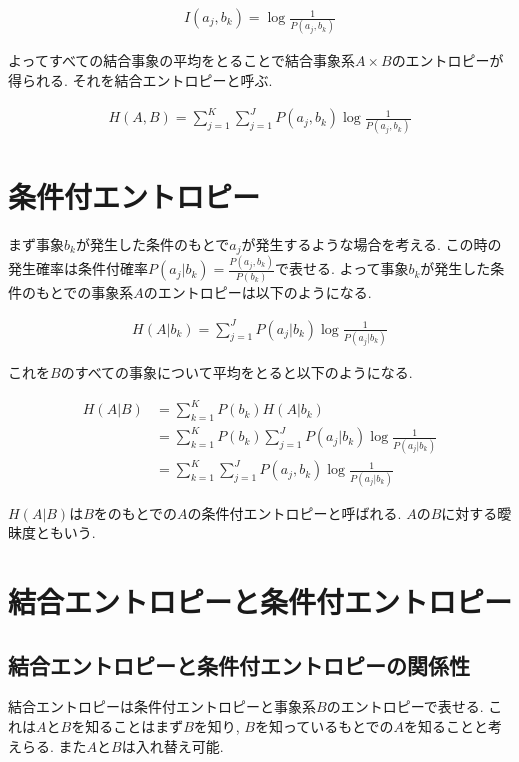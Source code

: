 \documentclass[dvipdfmx, 10pt]{jsarticle}
\begin{document}
\begin{align*}
    I(a_j, b_k) = \log \frac{1}{P(a_j, b_k)}
\end{align*}

よってすべての結合事象の平均をとることで結合事象系\(A \times B\)のエントロピーが得られる. それを結合エントロピーと呼ぶ. 

\begin{align*}
    H(A, B) = \sum_{j=1}^{K} \sum_{j=1}^{J} P(a_j, b_k) \log \frac{1}{P(a_j, b_k)}
\end{align*}

\section*{条件付エントロピー}
まず事象\(b_k\)が発生した条件のもとで\(a_j\)が発生するような場合を考える. 
この時の発生確率は条件付確率\(P(a_j | b_k) = \frac{P(a_j, b_k)}{P(b_k)}\)で表せる. 
よって事象\(b_k\)が発生した条件のもとでの事象系\(A\)のエントロピーは以下のようになる. 

\begin{align*}
    H(A | b_k) = \sum_{j=1}^{J} P(a_j | b_k) \log \frac{1}{P(a_j | b_k)}
\end{align*}

これを\(B\)のすべての事象について平均をとると以下のようになる. 

\begin{align*}
    H(A | B) 
    &= \sum_{k=1}^{K} P(b_k) H(A | b_k) \\
    &= \sum_{k=1}^{K} P(b_k) \sum_{j=1}^{J} P(a_j | b_k) \log \frac{1}{P(a_j | b_k)} \\
    &= \sum_{k=1}^{K} \sum_{j=1}^{J} P(a_j, b_k) \log \frac{1}{P(a_j | b_k)}
\end{align*}

\(H(A | B)\)は\(B\)をのもとでの\(A\)の条件付エントロピーと呼ばれる. 
\(A\)の\(B\)に対する曖昧度ともいう. 

\section*{結合エントロピーと条件付エントロピー}
\subsection*{結合エントロピーと条件付エントロピーの関係性}
結合エントロピーは条件付エントロピーと事象系\(B\)のエントロピーで表せる. 
これは\(A\)と\(B\)を知ることはまず\(B\)を知り, \(B\)を知っているもとでの\(A\)を知ることと考えらる. 
また\(A\)と\(B\)は入れ替え可能. 
\end{document}
